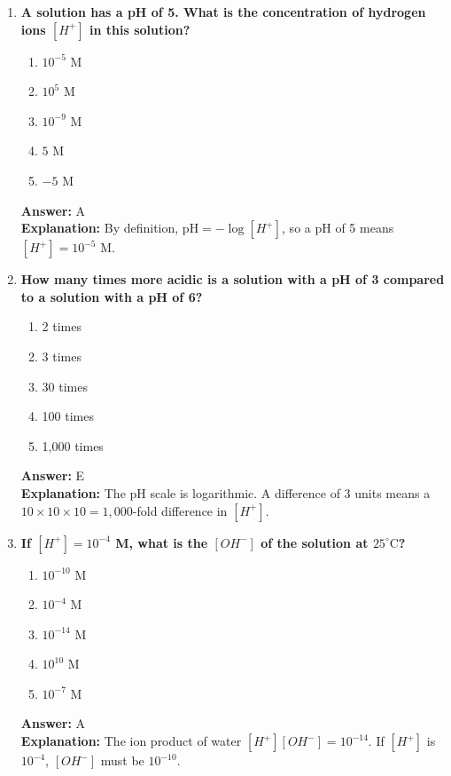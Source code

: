 \documentclass[11pt, a4paper]{article}
\begin{document}
\begin{enumerate}
\item \textbf{A solution has a pH of 5. What is the concentration of hydrogen ions $[H^+]$ in this solution?}
\begin{enumerate}[label=\Alph*.]
    \item $10^{-5}$ M
    \item $10^{5}$ M
    \item $10^{-9}$ M
    \item $5$ M
    \item $-5$ M
\end{enumerate}
\textbf{Answer:} A \\
\textbf{Explanation:} By definition, $\text{pH} = -\log[H^+]$, so a pH of 5 means $[H^+] = 10^{-5}$ M.

\item \textbf{How many times more acidic is a solution with a pH of 3 compared to a solution with a pH of 6?}
\begin{enumerate}[label=\Alph*.]
    \item 2 times
    \item 3 times
    \item 30 times
    \item 100 times
    \item 1,000 times
\end{enumerate}
\textbf{Answer:} E \\
\textbf{Explanation:} The pH scale is logarithmic. A difference of 3 units means a $10 \times 10 \times 10 = 1,000$-fold difference in $[H^+]$.

\item \textbf{If $[H^+] = 10^{-4}$ M, what is the $[OH^-]$ of the solution at $25^\circ\text{C}$?}
\begin{enumerate}[label=\Alph*.]
    \item $10^{-10}$ M
    \item $10^{-4}$ M
    \item $10^{-14}$ M
    \item $10^{10}$ M
    \item $10^{-7}$ M
\end{enumerate}
\textbf{Answer:} A \\
\textbf{Explanation:} The ion product of water $[H^+][OH^-] = 10^{-14}$. If $[H^+]$ is $10^{-4}$, $[OH^-]$ must be $10^{-10}$.


\end{enumerate}
\end{document}
